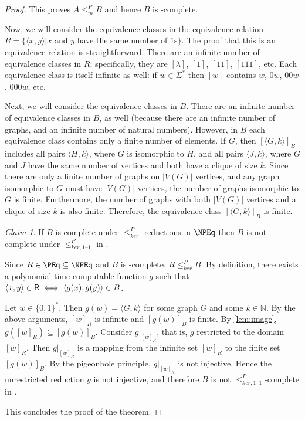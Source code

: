 \documentclass[draft]{article}
\theoremstyle{definition} \newtheorem{openproblem}[openproblem]{Open problem}
\theoremstyle{definition} \newtheorem{definition}[definition]{Definition}
\theoremstyle{remark} \newtheorem{remark}[remark]{Remark}
\newtheorem{claim}{Claim}
\newcommand{\sigmastar}{\{0, 1\}^{*}} %
\newcommand{\kr}{\leq^{P}_{ker}} %
\newcommand{\kri}{\leq^{P}_{ker,1\text{--}1}} %
\newcommand{\mor}{\leq^{P}_{m}} %
\newcommand{\pair}[2]{\langle#1,#2\rangle} %
\begin{document}
\begin{proof}
  This proves $A\mor B$ and hence $B$ is \NP-complete.

  Now, we will consider the equivalence classes in the equivalence relation $R=\{\pair{x}{y}|x$ and $y$ have the same number of $1$s$\}$.
  The proof that this is an equivalence relation is straightforward.
  There are an infinite number of equivalence classes in $R$; specifically, they are $[\lambda]$, $[1]$, $[11]$, $[111]$, etc.
  Each equivalence class is itself infinite as well: if $w\in\Sigma^*$ then $[w]$ contains $w$, $0w$, $00w$, $000w$, etc.

  Next, we will consider the equivalence classes in $B$.
  There are an infinite number of equivalence classes in $B$, as well (because there are an infinite number of graphs, and an infinite number of natural numbers).
  However, in $B$ each equivalence class contains only a finite number of elements.
  If $G$, then $[\pair{G}{k}]_B$ includes all pairs $\pair{H}{k}$, where $G$ is isomorphic to $H$, and all pairs $\pair{J}{k}$, where $G$ and $J$ have the same number of vertices and both have a clique of size $k$.
  Since there are only a finite number of graphs on $|V(G)|$ vertices, and any graph isomorphic to $G$ must have $|V(G)|$ vertices, the number of graphs isomorphic to $G$ is finite.
  Furthermore, the number of graphs with both $|V(G)|$ vertices and a clique of size $k$ is also finite.
  Therefore, the equivalence class $[\pair{G}{k}]_B$ is finite.

  \begin{claim}
    If $B$ is complete under $\kr$ reductions in $\NPEq$ then $B$ is not complete under $\kri$ in \NPEq.
  \end{claim}
  Since $R\in\PEq\subseteq\NPEq$ and $B$ is \NPEq-complete, $R\kr B$.
  By definition, there exists a polynomial time computable function $g$ such that $\pair{x}{y}\in\R\iff \pair{g(x)}{g(y)}\in B$.

  Let $w\in\sigmastar$.
  Then $g(w)=\pair{G}{k}$ for some graph $G$ and some $k\in\mathbb{N}$.
  By the above arguments, $[w]_R$ is infinite and $[g(w)]_B$ is finite.
  By \autoref{lem:image}, $g([w]_R)\subseteq [g(w)]_B$.
  Consider $g|_{[w]_R}$, that is, $g$ restricted to the domain $[w]_R$.
  Then $g|_{[w]_R}$ is a mapping from the infinite set $[w]_R$ to the finite set $[g(w)]_B$.
  By the pigeonhole principle, $g|_{[w]_R}$ is not injective.
  Hence the unrestricted reduction $g$ is not injective, and therefore $B$ is not $\kri$-complete in \NPEq.

  This concludes the proof of the theorem.
\end{proof}
\end{document}
